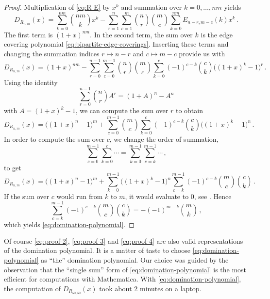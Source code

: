 \documentclass[12pt,reqno]{article}
\begin{document}
\begin{proof}
 Multiplication of \eqref{eq:R-E} by $x^k$ and summation over
 $k=0,\ldots,nm$ yields
 \begin{equation}
   \label{eq:proof-1}
   D_{R_{n,m}}(x) = \sum_{k=0}^{nm}{nm \choose k} x^k - \sum_{r=1}^n \sum_{c=1}^m {n \choose
      r} {m \choose c} \sum_{k=0}^{nm} E_{n-r,m-c}(k) x^k\,.
  \end{equation}
  The first term is $(1+x)^{nm}$. In the second term, the sum over $k$
  is the edge covering polynomial
  \eqref{eq:bipartite-edge-coverings}. Inserting these terms and
  changing the summation indices $r\mapsto n-r$ and $c\mapsto m-c$
  provide us with
  \begin{equation}
     \label{eq:proof-2}
     D_{R_{n,m}}(x) = (1+x)^{nm} - \sum_{r=0}^{n-1} \sum_{c=0}^{m-1} {n \choose
        r} {m \choose c}  \sum_{k=0}^{c}(-1)^{c-k}{c \choose k}\big((1+x)^k-1\big)^{r}\,.
   \end{equation}
   Using the identity
   \begin{equation}
     \label{eq:proof-aux}
     \sum_{r=0}^{n-1} {n \choose r} A^r = (1+A)^n - A^n
   \end{equation}
   with $A=(1+x)^k-1$, we can compute the sum over $r$ to obtain
   \begin{equation}
     \label{eq:proof-3}
     D_{R_{n,m}}(x) = \big((1+x)^n-1\big)^m  + \sum_{c=0}^{m-1}  {m
       \choose c}\sum_{k=0}^{c}(-1)^{c-k}{c \choose k}\big((1+x)^k-1\big)^{n}\,.
   \end{equation}
   In order to compute the sum over $c$, we change the order of
   summation,
   \begin{equation}
     \label{eq:marcs-trick}
     \sum_{c=0}^{m-1} \sum_{k=0}^c \cdots = \sum_{k=0}^{m-1} \sum_{c=k}^{m-1}\cdots\,,
   \end{equation}
   to get
    \begin{equation}
     \label{eq:proof-4}
     D_{R_{n,m}}(x) = \big((1+x)^n-1\big)^m  + \sum_{k=0}^{m-1}
     \big((1+x)^k-1\big)^{n} \sum_{c=k}^{m-1}(-1)^{c-k}{m
       \choose c}{c \choose k}\,.
   \end{equation}
   If the sum over $c$ would run from $k$ to $m$, it would evaluate to
   $0$, see \cite[Eq.~(5.24)]{graham:knuth:patashnik:94}. Hence
   \begin{equation}
     \label{eq:proof-aux-2}
     \sum_{c=k}^{m-1}(-1)^{c-k}{m
       \choose c}{c \choose k} = -(-1)^{m-k}{m \choose k}\,,
   \end{equation}
   which yields \eqref{eq:domination-polynomial}.
\end{proof}
Of course \eqref{eq:proof-2}, \eqref{eq:proof-3} and \eqref{eq:proof-4}
are also valid representations of the domination polynomial. It is a matter
of taste to choose \eqref{eq:domination-polynomial} as ``the''
  domination polynomial. Our choice was guided by the observation
  that the ``single sum'' form of \eqref{eq:domination-polynomial} is
  the most efficient for computations with Mathematica. With
  \eqref{eq:domination-polynomial}, the computation of
  $D_{R_{50,50}}(x)$ took about 2 minutes on a laptop. 
\end{document}
